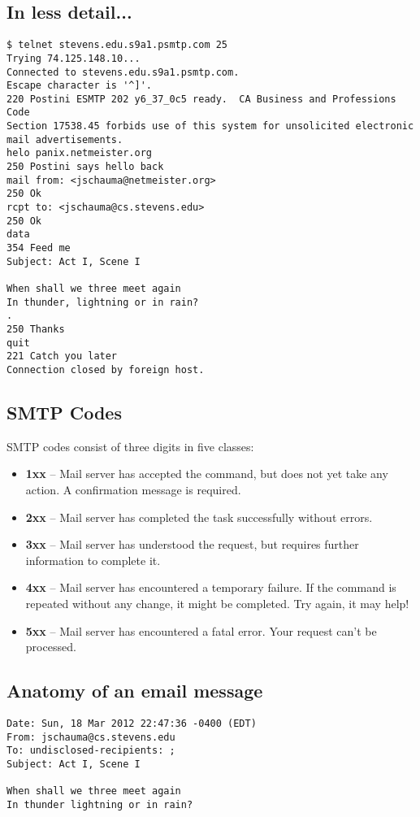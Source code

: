 \documentclass[xga]{xdvislides}
\begin{document}
\subsection{In less detail...}
\smallish
\begin{verbatim}
$ telnet stevens.edu.s9a1.psmtp.com 25
Trying 74.125.148.10...
Connected to stevens.edu.s9a1.psmtp.com.
Escape character is '^]'.
220 Postini ESMTP 202 y6_37_0c5 ready.  CA Business and Professions Code
Section 17538.45 forbids use of this system for unsolicited electronic
mail advertisements.
helo panix.netmeister.org
250 Postini says hello back
mail from: <jschauma@netmeister.org>
250 Ok
rcpt to: <jschauma@cs.stevens.edu>
250 Ok
data
354 Feed me
Subject: Act I, Scene I

When shall we three meet again
In thunder, lightning or in rain?
.
250 Thanks
quit
221 Catch you later
Connection closed by foreign host.
\end{verbatim}
\Normalsize

\subsection{SMTP Codes}
SMTP codes consist of three digits in five classes:
\begin{itemize}
	\item {\bf 1xx} --  Mail server has accepted the command, but does not yet
		take any action. A confirmation message is required.
	\item {\bf 2xx} --  Mail server has completed the task successfully
		without errors.
	\item {\bf 3xx} --  Mail server has understood the request, but requires
		further information to complete it.
	\item {\bf 4xx} --  Mail server has encountered a temporary failure. If
		the command is repeated without any change, it might be
		completed. Try again, it may help!
	\item {\bf 5xx} --  Mail server has encountered a fatal error. Your
		request can't be processed.
\end{itemize}

\subsection{Anatomy of an email message}
\begin{verbatim}
Date: Sun, 18 Mar 2012 22:47:36 -0400 (EDT)
From: jschauma@cs.stevens.edu
To: undisclosed-recipients: ;
Subject: Act I, Scene I

When shall we three meet again
In thunder lightning or in rain?

\end{verbatim}
\end{document}
